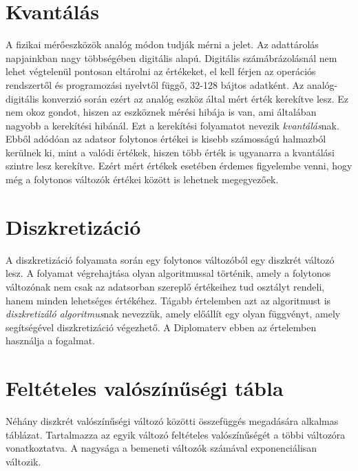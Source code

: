 \section{Kvantálás}
A fizikai mérőeszközök analóg módon tudják mérni a jelet. Az adattárolás napjainkban nagy többségében digitális alapú. Digitális számábrázolásnál nem lehet végtelenül pontosan eltárolni az értékeket, el kell férjen az operációs rendszertől és programozási nyelvtől függő, 32-128 bájtos adatként. Az analóg-digitális konverzió során ezért az analóg eszköz által mért érték kerekítve lesz. Ez nem okoz gondot, hiszen az eszköznek mérési hibája is van, ami általában nagyobb a kerekítési hibánál. Ezt a kerekítési folyamatot nevezik \emph{kvantálás}nak. Ebből adódóan az adatsor folytonos értékei is kisebb számosságú halmazból kerülnek ki, mint a valódi értékek, hiszen több érték is ugyanarra a kvantálási szintre lesz kerekítve. Ezért mért értékek esetében érdemes figyelembe venni, hogy még a folytonos változók értékei között is lehetnek megegyezőek.

\section{Diszkretizáció}
A diszkretizáció folyamata során egy folytonos változóból egy diszkrét változó lesz. A folyamat végrehajtása olyan algoritmussal történik, amely a folytonos változónak nem csak az adatsorban szereplő értékeihez tud osztályt rendeli, hanem minden lehetséges értékéhez. Tágabb értelemben azt az algoritmust is \emph{diszkretizáló algoritmus}nak nevezzük, amely előállít egy olyan függvényt, amely segítségével diszkretizáció végezhető. A Diplomaterv ebben az értelemben használja a fogalmat.

\section{Feltételes valószínűségi tábla}
Néhány diszkrét valószínűségi változó közötti összefüggés megadására alkalmas táblázat. Tartalmazza az egyik változó feltételes valószínűségét a többi változóra vonatkoztatva. A nagysága a bemeneti változók számával exponenciálisan változik.

